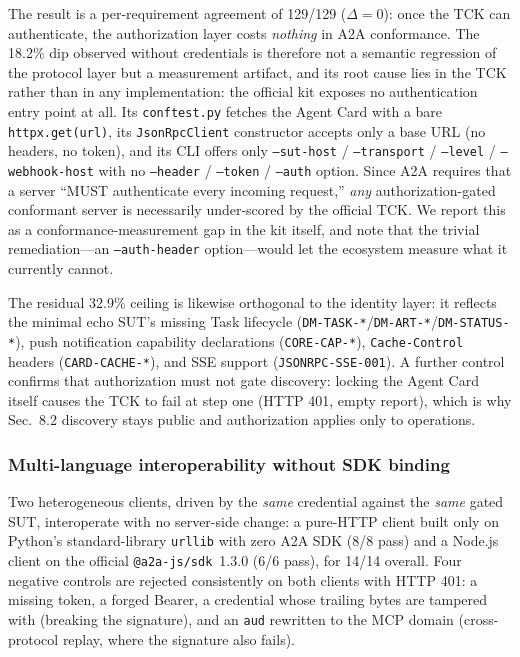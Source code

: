 \documentclass[10pt,twocolumn]{IEEEtran}
\begin{document}
The result is a per-requirement agreement of 129/129 ($\Delta = 0$): once
the TCK can authenticate, the authorization layer costs \emph{nothing} in
A2A conformance. The 18.2\% dip observed without credentials is therefore
not a semantic regression of the protocol layer but a measurement
artifact, and its root cause lies in the TCK rather than in any
implementation: the official kit exposes no authentication entry point at
all. Its \texttt{conftest.py} fetches the Agent Card with a bare
\texttt{httpx.get(url)}, its \texttt{JsonRpcClient} constructor accepts
only a base URL (no headers, no token), and its CLI offers only
\texttt{--sut-host} / \texttt{--transport} / \texttt{--level} /
\texttt{--webhook-host} with no \texttt{--header} / \texttt{--token} /
\texttt{--auth} option. Since A2A requires that a server
``MUST authenticate every incoming request,'' \emph{any} authorization-gated
conformant server is necessarily under-scored by the official TCK. We
report this as a conformance-measurement gap in the kit itself, and note
that the trivial remediation---an \texttt{--auth-header} option---would
let the ecosystem measure what it currently cannot.

The residual 32.9\% ceiling is likewise orthogonal to the identity layer:
it reflects the minimal echo SUT's missing Task lifecycle
(\texttt{DM-TASK-*}/\texttt{DM-ART-*}/\texttt{DM-STATUS-*}), push
notification capability declarations (\texttt{CORE-CAP-*}),
\texttt{Cache-Control} headers (\texttt{CARD-CACHE-*}), and SSE support
(\texttt{JSONRPC-SSE-001}). A further control confirms that authorization
must not gate discovery: locking the Agent Card itself causes the TCK to
fail at step one (HTTP 401, empty report), which is why Sec.~8.2 discovery
stays public and authorization applies only to operations.

\subsubsection*{Multi-language interoperability without SDK binding}

Two heterogeneous clients, driven by the \emph{same} credential against
the \emph{same} gated SUT, interoperate with no server-side change: a
pure-HTTP client built only on Python's standard-library \texttt{urllib}
with zero A2A SDK (8/8 pass) and a Node.js client on the official
\texttt{@a2a-js/sdk}~1.3.0 (6/6 pass), for 14/14 overall. Four negative
controls are rejected consistently on both clients with HTTP 401: a
missing token, a forged Bearer, a credential whose trailing bytes are
tampered with (breaking the signature), and an \texttt{aud} rewritten to
the MCP domain (cross-protocol replay, where the signature also fails).
\end{document}
